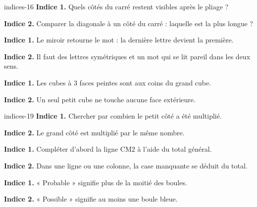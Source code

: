 \begin{blocEdition}{indices-16}
\textbf{Indice 1.} Quels côtés du carré restent visibles après le pliage ?\par\medskip\textbf{Indice 2.} Comparer la diagonale à un côté du carré : laquelle est la plus longue ?\par
{}\textbf{Indice 1.} Le miroir retourne le mot : la dernière lettre devient la première.\par\medskip\textbf{Indice 2.} Il faut des lettres symétriques et un mot qui se lit pareil dans les deux sens.\par
{}\textbf{Indice 1.} Les cubes à 3 faces peintes sont aux coins du grand cube.\par\medskip\textbf{Indice 2.} Un seul petit cube ne touche aucune face extérieure.\par

\end{blocEdition}
\begin{blocEdition}{indices-19}
\textbf{Indice 1.} Chercher par combien le petit côté a été multiplié.\par\medskip\textbf{Indice 2.} Le grand côté est multiplié par le même nombre.\par
{}\textbf{Indice 1.} Compléter d’abord la ligne CM2 à l’aide du total général.\par\medskip\textbf{Indice 2.} Dans une ligne ou une colonne, la case manquante se déduit du total.\par
{}\textbf{Indice 1.} « Probable » signifie plus de la moitié des boules.\par\medskip\textbf{Indice 2.} « Possible » signifie au moins une boule bleue.\par

\end{blocEdition}
